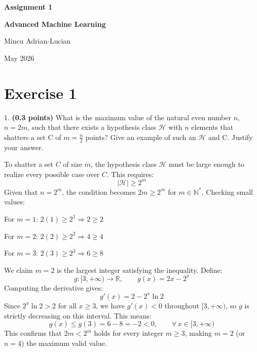 \documentclass[12pt]{article}
\begin{document}
\begin{titlepage}
    \centering
    {\Huge \textbf{Assignment 1} \par}
    \vspace{1.5cm}
    {\Large \textbf{Advanced Machine Learning} \par}
    \vspace{2cm}
    {\large Mincu Adrian-Lucian \par} %
    \vfill
    {\large May 2026 \par}
\end{titlepage}

\tableofcontents
\newpage

\section*{Exercise 1}

1. \textbf{(0.3 points)} What is the maximum value of the natural even number $n$, $n=2m$, such that there exists a hypothesis class $\mathcal{H}$ with $n$ elements that shatters a set C of $m = \frac{n}{2}$ points? Give an example of such an $\mathcal{H}$ and C. Justify your answer.
\newline

To shatter a set $C$ of size $m$, the hypothesis class $\mathcal{H}$ must be large enough to realize every possible case over $C$. This requires:
$$|\mathcal{H}| \geq 2^m$$
Given that $n = 2^m$, the condition becomes $2m \geq 2^m$ for $m \in \mathbb{N}^*$. Checking small values:

\noindent For $m = 1$: $2(1) \geq 2^1 \Rightarrow 2 \geq 2$ \quad \checkmark

\noindent For $m = 2$: $2(2) \geq 2^2 \Rightarrow 4 \geq 4$ \quad \checkmark

\noindent For $m = 3$: $2(3) \geq 2^3 \Rightarrow 6 \geq 8$ \quad \texttimes
\newline 

\noindent We claim $m = 2$ is the largest integer satisfying the inequality. Define:
$$g : [3, +\infty) \to \mathbb{R}, \qquad g(x) = 2x - 2^x$$
Computing the derivative gives:
$$g'(x) = 2 - 2^x \ln 2$$
Since $2^x \ln 2 > 2$ for all $x \geq 3$, we have $g'(x) < 0$ throughout $[3, +\infty)$, so $g$ is strictly decreasing on this interval. This means:
$$g(x) \leq g(3) = 6 - 8 = -2 < 0, \qquad \forall\, x \in [3, +\infty)$$
\noindent This confirms that $2m < 2^m$ holds for every integer $m \geq 3$, making $m = 2$ (or $n = 4$) the maximum valid value.
\newline
\end{document}
